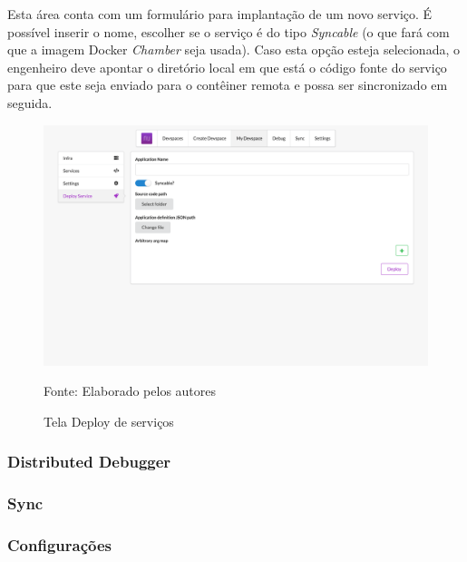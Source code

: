\documentclass[twosideprint]{politex}
\newcommand{\legend}[1]{\begin{center}\def\caption{}\caption{#1}\end{center}}
\begin{document}
Esta área conta com um formulário para implantação de um novo serviço. É possível inserir o nome, escolher se o serviço é do tipo \textit{Syncable} (o que fará com que a imagem Docker \textit{Chamber} seja usada). Caso esta opção esteja selecionada, o engenheiro deve apontar o diretório local em que está o código fonte do serviço para que este seja enviado para o contêiner remota e possa ser sincronizado em seguida.

\begin{figure}[htb]
	\caption{\label{fig_frontnd_deploy}Tela Deploy de serviços}
	\begin{center}
	\includegraphics[width=\textwidth,keepaspectratio]{pictures/frontend/frontend-deploy.png}
	\end{center}
	\legend{Fonte: Elaborado pelos autores}
\end{figure}

\subsubsection{Distributed Debugger}

\subsubsection{Sync}

\subsubsection{Configurações}
\end{document}
